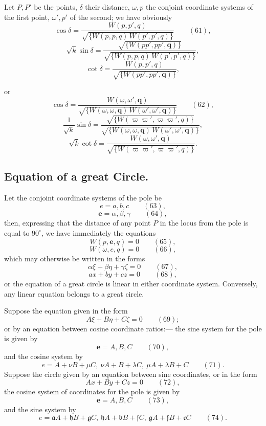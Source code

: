 \documentclass[11pt]{article}
\begin{document}
Let $P, P'$ be the points, $\delta$ their distance, $\omega, p$ the conjoint coordinate systems of the first point, $\omega', p'$ of the second; we have obviously
\[
\cos\delta = \frac{W(p, p', q)}{\sqrt{\{W(p, p, q)\,W(p', p', q)\}}} \qquad (61),
\]
\[
\sqrt{k}\sin\delta = \frac{\sqrt{\{W(pp', pp', \mathbf{q})\}}}{\sqrt{\{W(p, p, q)\,W(p', p', q)\}}},
\]
\[
\cot\delta = \frac{W(p, p', q)}{\sqrt{\{W(pp', pp', \mathbf{q})\}}},
\]

\newpage
\setcounter{page}{219}

or
\[
\cos\delta = \frac{W(\omega, \omega', \mathbf{q})}{\sqrt{\{W(\omega, \omega, \mathbf{q})\,W(\omega', \omega', \mathbf{q})\}}} \qquad (62),
\]
\[
\frac{1}{\sqrt{k}}\sin\delta = \frac{\sqrt{\{W(\varpi\varpi', \varpi\varpi', q)\}}}{\sqrt{\{W(\omega, \omega, \mathbf{q})\,W(\omega', \omega', \mathbf{q})\}}},
\]
\[
\sqrt{k}\cot\delta = \frac{W(\omega, \omega', \mathbf{q})}{\sqrt{\{W(\varpi\varpi', \varpi\varpi', q)\}}}.
\]

\subsection*{Equation of a great Circle.}

Let the conjoint coordinate systems of the pole be
\[
e = a, b, c \qquad (63),
\]
\[
\mathbf{e} = \alpha, \beta, \gamma \qquad (64),
\]
then, expressing that the distance of any point $P$ in the locus from the pole is equal to $90^\circ$, we have immediately the equations
\[
W(p, \mathbf{e}, q) = 0 \qquad (65),
\]
\[
W(\omega, e, q) = 0 \qquad (66),
\]
which may otherwise be written in the forms
\[
\alpha\xi + \beta\eta + \gamma\zeta = 0 \qquad (67),
\]
\[
ax + by + cz = 0 \qquad (68),
\]
or the equation of a great circle is linear in either coordinate system. Conversely, any linear equation belongs to a great circle.

Suppose the equation given in the form
\[
A\xi + B\eta + C\zeta = 0 \qquad (69);
\]
or by an equation between cosine coordinate ratios:--- the sine system for the pole is given by
\[
\mathbf{e} = A, B, C \qquad (70),
\]
and the cosine system by
\[
e = A + \nu B + \mu C,\ \nu A + B + \lambda C,\ \mu A + \lambda B + C \qquad (71).
\]
Suppose the circle given by an equation between sine coordinates, or in the form
\[
Ax + By + Cz = 0 \qquad (72),
\]
the cosine system of coordinates for the pole is given by
\[
\mathbf{e} = A, B, C \qquad (73),
\]
and the sine system by
\[
e = \mathfrak{a}A + \mathfrak{h}B + \mathfrak{g}C,\ \mathfrak{h}A + \mathfrak{b}B + \mathfrak{f}C,\ \mathfrak{g}A + \mathfrak{f}B + \mathfrak{c}C \qquad (74).
\]
\end{document}
